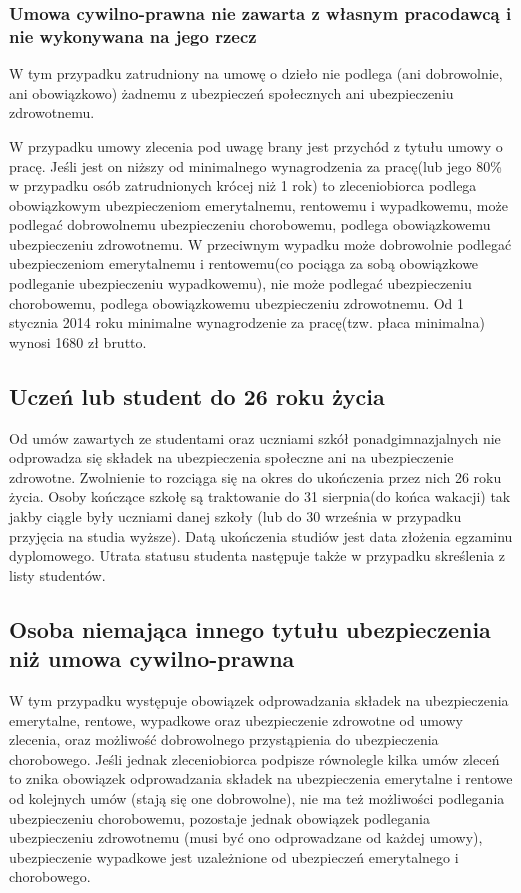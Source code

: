 \subsubsection{Umowa cywilno-prawna nie zawarta z własnym pracodawcą i nie wykonywana na jego rzecz}
W tym przypadku zatrudniony na umowę o dzieło nie podlega (ani dobrowolnie, ani obowiązkowo) żadnemu z ubezpieczeń społecznych ani ubezpieczeniu zdrowotnemu. 

W przypadku umowy zlecenia pod uwagę brany jest przychód z tytułu umowy o pracę. Jeśli jest on niższy od minimalnego wynagrodzenia za pracę(lub jego 80\% w przypadku osób zatrudnionych krócej niż 1 rok) to zleceniobiorca podlega obowiązkowym ubezpieczeniom emerytalnemu, rentowemu i wypadkowemu, może podlegać dobrowolnemu ubezpieczeniu chorobowemu, podlega obowiązkowemu ubezpieczeniu zdrowotnemu. W przeciwnym wypadku może dobrowolnie podlegać ubezpieczeniom emerytalnemu i rentowemu(co pociąga za sobą obowiązkowe podleganie ubezpieczeniu wypadkowemu), nie może podlegać ubezpieczeniu chorobowemu, podlega obowiązkowemu ubezpieczeniu zdrowotnemu. Od 1 stycznia 2014 roku minimalne wynagrodzenie za pracę(tzw. płaca minimalna) wynosi 1680 zł brutto.

\subsection[Uczeń lub student do 26 roku życia][Uczeń lub student do 26 roku życia]{Uczeń lub student do 26 roku życia}
Od umów zawartych ze studentami oraz uczniami szkół ponadgimnazjalnych nie odprowadza się składek na ubezpieczenia społeczne ani na ubezpieczenie zdrowotne. Zwolnienie to rozciąga się na okres do ukończenia przez nich 26 roku życia. Osoby kończące szkołę są traktowanie do 31 sierpnia(do końca wakacji)  tak jakby ciągle były uczniami danej szkoły (lub do 30 września w przypadku przyjęcia na studia wyższe). Datą ukończenia studiów jest data złożenia egzaminu dyplomowego. Utrata statusu studenta następuje także w przypadku skreślenia z listy studentów.

\subsection[Osoba niemająca innego tytułu ubezpieczenia niż umowa cywilno-prawna][Osoba niemająca innego tytułu ubezpieczenia niż umowa cywilno-prawna]{Osoba niemająca innego tytułu ubezpieczenia niż umowa cywilno-prawna}
\label{inni}
W tym przypadku występuje obowiązek odprowadzania składek na ubezpieczenia emerytalne, rentowe, wypadkowe oraz ubezpieczenie zdrowotne od umowy zlecenia, oraz możliwość dobrowolnego przystąpienia do ubezpieczenia chorobowego. Jeśli jednak zleceniobiorca podpisze równolegle kilka umów zleceń to znika obowiązek odprowadzania składek na ubezpieczenia emerytalne i rentowe od kolejnych umów (stają się one dobrowolne), nie ma też możliwości podlegania ubezpieczeniu chorobowemu, pozostaje jednak obowiązek podlegania ubezpieczeniu zdrowotnemu (musi być ono odprowadzane od każdej umowy), ubezpieczenie wypadkowe jest uzależnione od ubezpieczeń emerytalnego i chorobowego.

